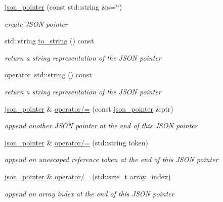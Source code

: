 \begin{DoxyCompactItemize}
\item 
\mbox{\hyperlink{classnlohmann_1_1json__pointer_a7f32d7c62841f0c4a6784cf741a6e4f8}{json\+\_\+pointer}} (const std\+::string \&s=\char`\"{}\char`\"{})
\begin{DoxyCompactList}\small\item\em create J\+S\+ON pointer \end{DoxyCompactList}\item 
std\+::string \mbox{\hyperlink{classnlohmann_1_1json__pointer_a3d4b15d32d096e3776c5d2c773b524f5}{to\+\_\+string}} () const
\begin{DoxyCompactList}\small\item\em return a string representation of the J\+S\+ON pointer \end{DoxyCompactList}\item 
\mbox{\hyperlink{classnlohmann_1_1json__pointer_ae9015c658f99cf3d48a8563accc79988}{operator std\+::string}} () const
\begin{DoxyCompactList}\small\item\em return a string representation of the J\+S\+ON pointer \end{DoxyCompactList}\item 
\mbox{\hyperlink{classnlohmann_1_1json__pointer}{json\+\_\+pointer}} \& \mbox{\hyperlink{classnlohmann_1_1json__pointer_a7395bd0af29ac23fd3f21543c935cdfa}{operator/=}} (const \mbox{\hyperlink{classnlohmann_1_1json__pointer}{json\+\_\+pointer}} \&ptr)
\begin{DoxyCompactList}\small\item\em append another J\+S\+ON pointer at the end of this J\+S\+ON pointer \end{DoxyCompactList}\item 
\mbox{\hyperlink{classnlohmann_1_1json__pointer}{json\+\_\+pointer}} \& \mbox{\hyperlink{classnlohmann_1_1json__pointer_abdd21567b2b1d69329af0f520335e68b}{operator/=}} (std\+::string token)
\begin{DoxyCompactList}\small\item\em append an unescaped reference token at the end of this J\+S\+ON pointer \end{DoxyCompactList}\item 
\mbox{\hyperlink{classnlohmann_1_1json__pointer}{json\+\_\+pointer}} \& \mbox{\hyperlink{classnlohmann_1_1json__pointer_a64c8401529131bad1e486d91d703795f}{operator/=}} (std\+::size\+\_\+t array\+\_\+index)
\begin{DoxyCompactList}\small\item\em append an array index at the end of this J\+S\+ON pointer \end{DoxyCompactList}\item 

\end{DoxyCompactItemize}
